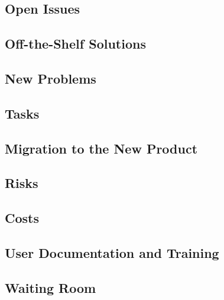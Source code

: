 \documentclass{article}
\begin{document}
\subsection{Open Issues}
\subsection{Off-the-Shelf Solutions}
\subsection{New Problems}
\subsection{Tasks}
\subsection{Migration to the New Product}
\subsection{Risks}
\subsection{Costs}
\subsection{User Documentation and Training}
\subsection{Waiting Room}


\end{document}
